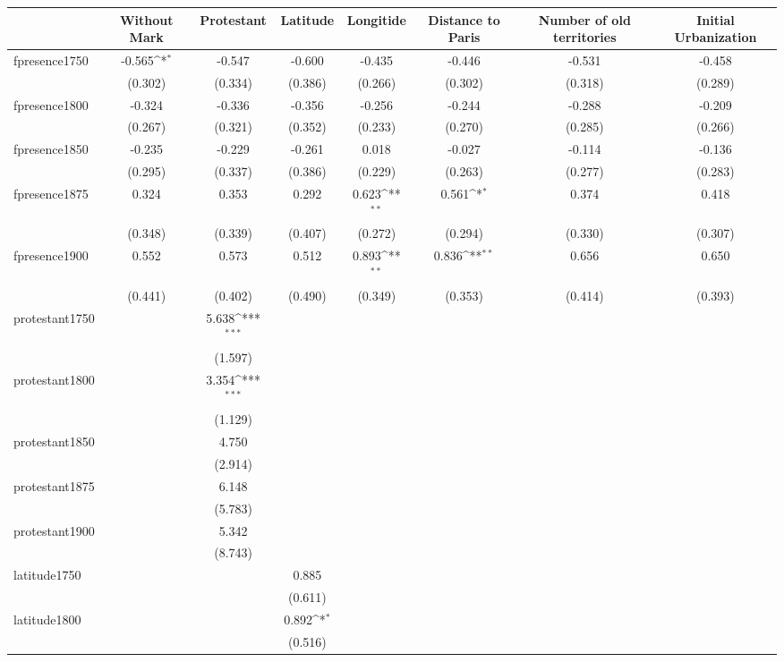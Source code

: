 {
\def\sym#1{\ifmmode^{#1}\else\(^{#1}\)\fi}
\begin{tabular}{@{\extracolsep{2pt}}l*{7}{c}@{}}
\hline\hline


 & Without Mark & Protestant & Latitude & Longitide & Distance to Paris & Number of old territories & Initial Urbanization \\
\hline
fpresence1750 & -0.565\sym{*} & -0.547 & -0.600 & -0.435 & -0.446 & -0.531 & -0.458 \\
 & (0.302) & (0.334) & (0.386) & (0.266) & (0.302) & (0.318) & (0.289) \\
fpresence1800 & -0.324 & -0.336 & -0.356 & -0.256 & -0.244 & -0.288 & -0.209 \\
 & (0.267) & (0.321) & (0.352) & (0.233) & (0.270) & (0.285) & (0.266) \\
fpresence1850 & -0.235 & -0.229 & -0.261 & 0.018 & -0.027 & -0.114 & -0.136 \\
 & (0.295) & (0.337) & (0.386) & (0.229) & (0.263) & (0.277) & (0.283) \\
fpresence1875 & 0.324 & 0.353 & 0.292 & 0.623\sym{**} & 0.561\sym{*} & 0.374 & 0.418 \\
 & (0.348) & (0.339) & (0.407) & (0.272) & (0.294) & (0.330) & (0.307) \\
fpresence1900 & 0.552 & 0.573 & 0.512 & 0.893\sym{**} & 0.836\sym{**} & 0.656 & 0.650 \\
 & (0.441) & (0.402) & (0.490) & (0.349) & (0.353) & (0.414) & (0.393) \\
protestant1750 &  & 5.638\sym{***} &  &  &  &  &  \\
 &  & (1.597) &  &  &  &  &  \\
protestant1800 &  & 3.354\sym{***} &  &  &  &  &  \\
 &  & (1.129) &  &  &  &  &  \\
protestant1850 &  & 4.750 &  &  &  &  &  \\
 &  & (2.914) &  &  &  &  &  \\
protestant1875 &  & 6.148 &  &  &  &  &  \\
 &  & (5.783) &  &  &  &  &  \\
protestant1900 &  & 5.342 &  &  &  &  &  \\
 &  & (8.743) &  &  &  &  &  \\
latitude1750 &  &  & 0.885 &  &  &  &  \\
 &  &  & (0.611) &  &  &  &  \\
latitude1800 &  &  & 0.892\sym{*} &  &  &  &  \\
 &  &  & (0.516) &  &  &  &  \\

\end{tabular}}
